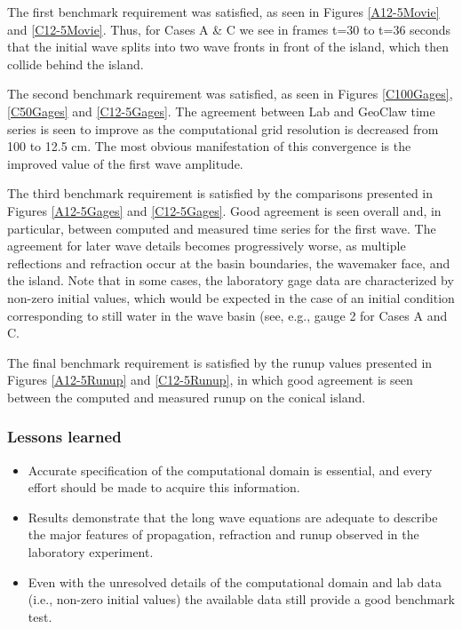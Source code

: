   The first benchmark requirement was satisfied, as seen in Figures \ref{A12-5Movie} and \ref{C12-5Movie}.  Thus, for Cases A \& C we see in frames t=30 to t=36 seconds that the initial wave splits into two wave fronts in front of the island, which then collide behind the island. 

  The second benchmark requirement was satisfied, as seen in Figures \ref{C100Gages}, \ref{C50Gages} and \ref{C12-5Gages}.  The agreement between Lab and GeoClaw time series is seen to improve as the computational grid resolution is decreased from 100 to 12.5 cm.  The most obvious manifestation of this convergence is the improved value of the first wave amplitude.

  The third benchmark requirement is satisfied by the comparisons presented in Figures \ref{A12-5Gages} and \ref{C12-5Gages}.  Good agreement is seen overall and, in particular, between computed and measured time series for the first wave.  The agreement for later wave details becomes progressively worse, as multiple reflections and refraction occur at the basin boundaries, the wavemaker face, and the island.  Note that in some cases, the laboratory gage data are characterized by non-zero initial values, which would be expected in the case of an initial condition corresponding to still water in the wave basin (see, e.g., gauge 2 for Cases A and C. 

  The final benchmark requirement is satisfied by the runup values presented in Figures \ref{A12-5Runup} and \ref{C12-5Runup}, in which good agreement is seen between the computed and measured runup on the conical island.

\subsubsection{Lessons learned}

\begin{itemize}
\item Accurate specification of the computational domain is essential, and every effort should be made to acquire this information.
\item Results demonstrate that the long wave equations are adequate to describe the major features of propagation, refraction and runup observed in the laboratory experiment.
\item Even with the unresolved details of the computational domain and lab data (i.e., non-zero initial values) the available data still provide a good benchmark test.
\end{itemize}

